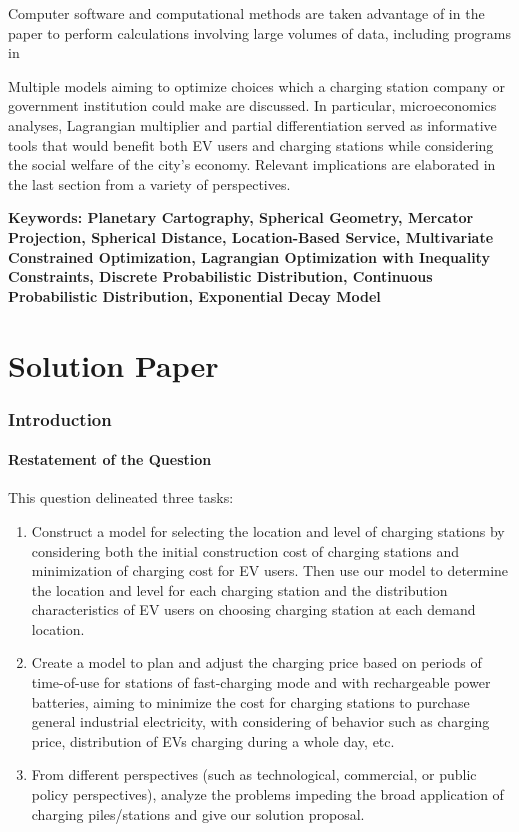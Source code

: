 \documentclass[10pt]{article}
\begin{document}
Computer software and computational methods are taken advantage of in the paper to perform calculations involving large volumes of data, including programs in 

Multiple models aiming to optimize choices which a charging station company or government institution could make are discussed. In particular, microeconomics analyses, Lagrangian multiplier and partial differentiation served as informative tools that would benefit both EV users and charging stations while considering the social welfare of the city's economy. Relevant implications are elaborated in the last section from a variety of perspectives.

\textbf{Keywords: Planetary Cartography, Spherical Geometry, Mercator Projection, Spherical Distance, Location-Based Service, Multivariate Constrained Optimization, Lagrangian Optimization with Inequality Constraints, Discrete Probabilistic Distribution, Continuous Probabilistic Distribution, Exponential Decay Model}

\newpage
\tableofcontents

\pagestyle{fancy}
\fancyhf{}

\newpage
\part{Solution Paper}
\section{Introduction}
\subsection{Restatement of the Question}
This question delineated three tasks: 
\begin{enumerate}
    \item Construct a model for selecting the location and level of charging stations by considering both the initial construction cost of charging stations and minimization of charging cost for EV users. Then use our model to determine the location and level for each charging station and the distribution characteristics of EV users on choosing charging station at each demand location.
    \item Create a model to plan and adjust the charging price based on periods of time-of-use for stations of fast-charging mode and with rechargeable power batteries, aiming to minimize the cost for charging stations to purchase general industrial electricity, with considering of behavior such as charging price, distribution of EVs charging during a whole day, etc. 
    \item From different perspectives (such as technological, commercial, or public policy perspectives), analyze the problems impeding the broad application of charging piles/stations and give our solution proposal.
\end{enumerate}
\end{document}
